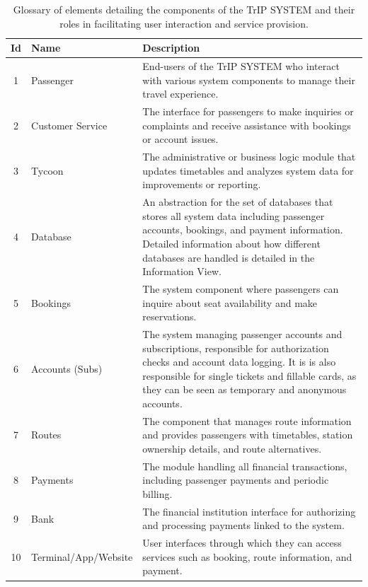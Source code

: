 \begin{table}[H]
    \centering
    \begin{tabular}{@{}clp{9cm}@{}}
    \toprule
    \textbf{Id} & \textbf{Name} & \textbf{Description} \\
    \midrule
    1 & Passenger & End-users of the TrIP SYSTEM who interact with various system components to manage their travel experience. \\
    2 & Customer Service & The interface for passengers to make inquiries or complaints and receive assistance with bookings or account issues. \\
    3 & Tycoon & The administrative or business logic module that updates timetables and analyzes system data for improvements or reporting. \\
    4 & Database & An abstraction for the set of databases that stores all system data including passenger accounts, bookings, and payment information. Detailed information about how different databases are handled is detailed in the Information View.\\
    5 & Bookings & The system component where passengers can inquire about seat availability and make reservations. \\
    6 & Accounts (Subs) & The system managing passenger accounts and subscriptions, responsible for authorization checks and account data logging. 
    It is is also responsible for single tickets and fillable cards, as they can be seen as temporary and anonymous accounts. \\
    7 & Routes & The component that manages route information and provides passengers with timetables, station ownership details, and route alternatives. \\
    8 & Payments & The module handling all financial transactions, including passenger payments and periodic billing. \\
    9 & Bank & The financial institution interface for authorizing and processing payments linked to the system. \\
    10 & Terminal/App/Website & User interfaces through which they can access services such as booking, route information, and payment. \\
    \bottomrule
    \end{tabular}
    \caption{Glossary of elements detailing the components of the TrIP SYSTEM and their roles in facilitating user interaction and service provision.}
    \label{tab:glossary_trip_system}
\end{table}


